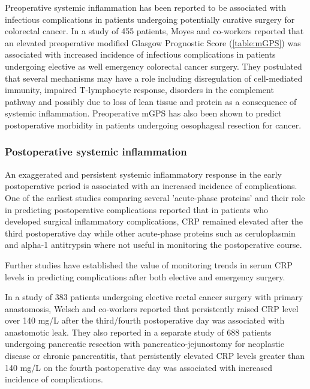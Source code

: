 Preoperative systemic inflammation has been reported to be associated with infectious complications in patients undergoing potentially curative surgery for colorectal cancer.\parencite{moyes_preoperative_2009} In a study of 455 patients, Moyes and co-workers reported that an elevated preoperative modified Glasgow Prognostic Score (\ref{table:mGPS}) was associated with increased incidence of infectious complications in patients undergoing elective as well emergency colorectal cancer surgery. They postulated that several mechanisms may have a role including disregulation of cell-mediated immunity, impaired T-lymphocyte response, disorders in the complement pathway and possibly due to loss of lean tissue and protein as a consequence of systemic inflammation. Preoperative mGPS has also been shown to predict postoperative morbidity in patients undergoing oesophageal resection for cancer.\parencite{vashist_glasgow_2010} 

\subsubsection{Postoperative systemic inflammation}
An exaggerated and persistent systemic inflammatory response in the early postoperative period is associated with an increased incidence of complications. One of the earliest studies comparing several 'acute-phase proteins' and their role in predicting postoperative complications reported that in patients who developed surgical inflammatory complications, CRP remained elevated after the third postoperative day while other acute-phase proteins such as ceruloplasmin and alpha-1 antitrypsin where not useful in monitoring the postoperative course.\parencite{fischer_quantitation_1976} 

Further studies have established the value of monitoring trends in serum CRP levels in predicting complications after both elective and emergency surgery.\parencite{mustard_c-reactive_1987}

In a study of 383 patients undergoing elective rectal cancer surgery with primary anastomosis, Welsch and co-workers reported that persistently raised CRP level over 140 mg/L after the third/fourth postoperative day was associated with anastomotic leak.\parencite{welsch_c-reactive_2007} They also reported in a separate study of 688 patients undergoing pancreatic resection with pancreatico-jejunostomy for neoplastic disease or chronic pancreatitis, that persistently elevated CRP levels greater than 140 mg/L on the fourth postoperative day was associated with increased incidence of complications. 

